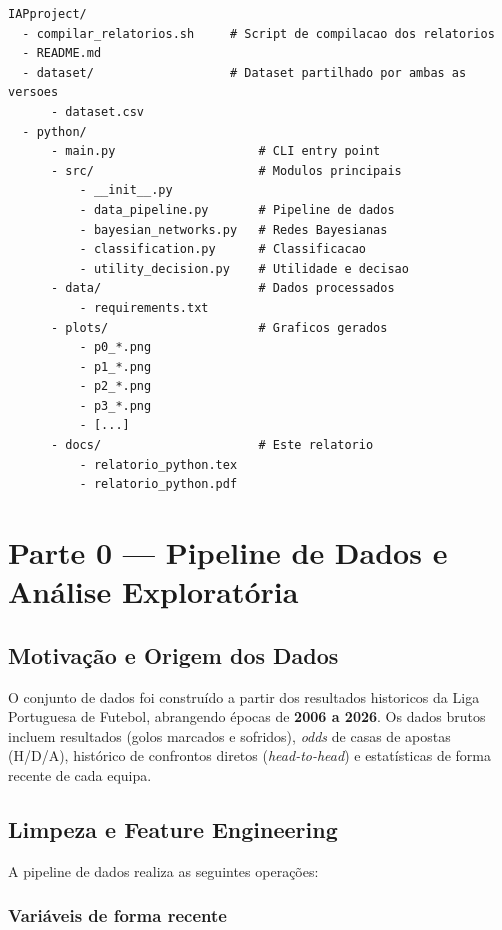 \documentclass[12pt, a4paper]{article}
\begin{document}
\begin{verbatim}
IAPproject/
  - compilar_relatorios.sh     # Script de compilacao dos relatorios
  - README.md
  - dataset/                   # Dataset partilhado por ambas as versoes
      - dataset.csv
  - python/
      - main.py                    # CLI entry point
      - src/                       # Modulos principais
          - __init__.py
          - data_pipeline.py       # Pipeline de dados
          - bayesian_networks.py   # Redes Bayesianas
          - classification.py      # Classificacao
          - utility_decision.py    # Utilidade e decisao
      - data/                      # Dados processados
          - requirements.txt
      - plots/                     # Graficos gerados
          - p0_*.png
          - p1_*.png
          - p2_*.png
          - p3_*.png
          - [...]
      - docs/                      # Este relatorio
          - relatorio_python.tex
          - relatorio_python.pdf
\end{verbatim}

\section{Parte 0 --- Pipeline de Dados e Análise Exploratória}

\subsection{Motivação e Origem dos Dados}

O conjunto de dados foi construído a partir dos resultados historicos da Liga Portuguesa de Futebol, abrangendo épocas de \textbf{2006 a 2026}. Os dados brutos incluem resultados (golos marcados e sofridos), \textit{odds} de casas de apostas (H/D/A), histórico de confrontos diretos (\textit{head-to-head}) e estatísticas de forma recente de cada equipa.

\subsection{Limpeza e Feature Engineering}

A pipeline de dados realiza as seguintes operações:

\subsubsection{Variáveis de forma recente}
\end{document}
